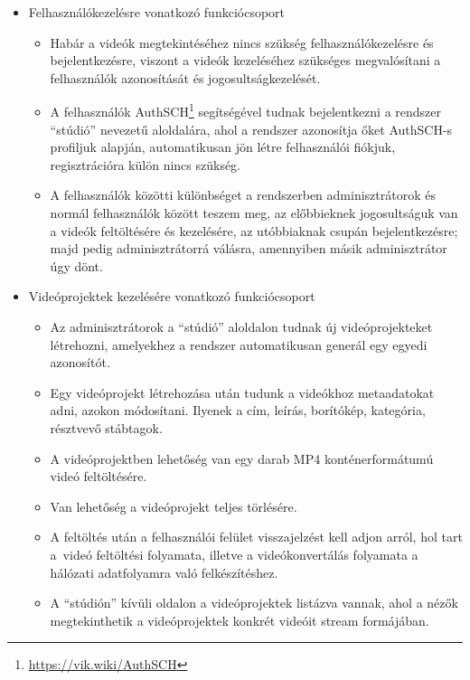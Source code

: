 \begin{itemize}
  \item Felhasználókezelésre vonatkozó funkciócsoport
        \begin{itemize}
          \item Habár a videók megtekintéséhez nincs szükség felhasználókezelésre és bejelentkezésre, viszont a videók kezeléséhez szükséges megvalósítani a felhasználók azonosítását és jogosultságkezelését.
          \item A felhasználók AuthSCH\footnote{\url{https://vik.wiki/AuthSCH}} segítségével tudnak bejelentkezni a rendszer ``stúdió'' nevezetű aloldalára, ahol a rendszer azonosítja őket AuthSCH-s profiljuk alapján, automatikusan jön létre felhasználói fiókjuk, regisztrációra külön nincs szükség.
          \item A felhasználók közötti különbséget a rendszerben adminisztrátorok és normál felhasználók között teszem meg, az előbbieknek jogosultságuk van a videók feltöltésére és kezelésére, az utóbbiaknak csupán bejelentkezésre; majd pedig adminisztrátorrá válásra, amennyiben másik adminisztrátor úgy dönt.
        \end{itemize}

  \item Videóprojektek kezelésére vonatkozó funkciócsoport
        \begin{itemize}
          \item Az adminisztrátorok a ``stúdió'' aloldalon tudnak új videóprojekteket létrehozni, amelyekhez a rendszer automatikusan generál egy egyedi azonosítót.
          \item Egy videóprojekt létrehozása után tudunk a videókhoz metaadatokat adni, azokon módosítani. Ilyenek a cím, leírás, borítókép, kategória, résztvevő stábtagok.
          \item A videóprojektben lehetőség van egy darab MP4 konténerformátumú videó feltöltésére.
          \item Van lehetőség a videóprojekt teljes törlésére.
          \item A feltöltés után a felhasználói felület visszajelzést kell adjon arról, hol tart a~videó feltöltési folyamata, illetve a videókonvertálás folyamata a hálózati adatfolyamra való felkészítéshez.
          \item A ``stúdión'' kívüli oldalon a videóprojektek listázva vannak, ahol a nézők megtekinthetik a videóprojektek konkrét videóit stream formájában.
        \end{itemize}


\end{itemize}
